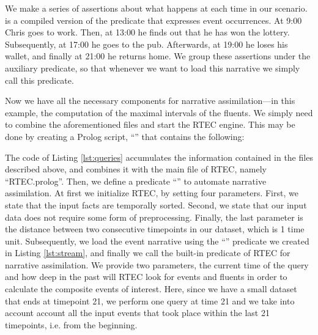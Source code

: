 \begin{minipage}{\linewidth}

\end{minipage}


We make a series of assertions about what happens at each time in our scenario.  is a compiled version of the  predicate that expresses event occurrences. At 9:00 Chris goes to work. Then, at 13:00 he finds out that he has won the lottery. Subsequently, at 17:00 he goes to the pub. Afterwards, at 19:00 he loses his wallet, and finally at 21:00 he returns home. We group these assertions under the auxiliary  predicate, so that whenever we want to load this narrative we simply call this predicate.

Now we have all the necessary components for narrative assimilation---in this example, the computation of the maximal intervals of the fluents. We simply need to combine the aforementioned files and start the RTEC engine. This may be done by creating a Prolog script, ``'' that contains the following:

\begin{minipage}{\linewidth}

\end{minipage}

The code of Listing \ref{lst:queries} accumulates the information contained in the files described above, and combines it with the main file of RTEC, namely ``RTEC.prolog''. Then, we define a predicate ``''  to automate narrative assimilation. At first we initialize RTEC, by setting four parameters. First, we state that the input facts are temporally sorted. 
Second, we state that our input data does not require some form of preprocessing. Finally, the last parameter is the distance between two consecutive timepoints in our dataset, which is 1 time unit. Subsequently, we load the event narrative using the ``'' predicate we created in Listing \ref{lst:stream}, and finally we call the built-in  predicate of RTEC for narrative assimilation. We provide two parameters, the current time of the query and how deep in the past will RTEC look for events and fluents in order to calculate the composite events of interest. Here, since we have a small dataset that ends at timepoint 21, we perform one query at time 21 and we take into account account all the input events that took place within the last 21 timepoints, i.e. from the beginning.

